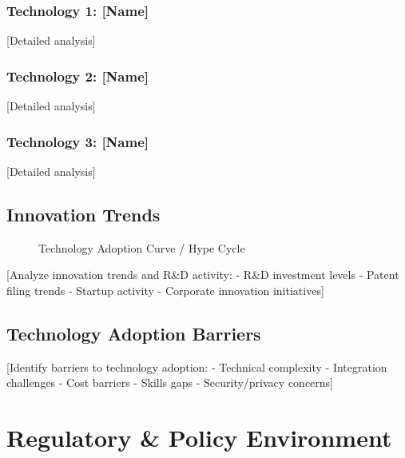 \documentclass[11pt,letterpaper]{report}
\begin{document}
\subsection{Technology 1: [Name]}
[Detailed analysis]

\subsection{Technology 2: [Name]}
[Detailed analysis]

\subsection{Technology 3: [Name]}
[Detailed analysis]

\section{Innovation Trends}


\begin{figure}[htbp]
\centering
\caption{Technology Adoption Curve / Hype Cycle}
\label{fig:innovation}
\end{figure}

[Analyze innovation trends and R\&D activity:
- R\&D investment levels
- Patent filing trends
- Startup activity
- Corporate innovation initiatives]

\section{Technology Adoption Barriers}

[Identify barriers to technology adoption:
- Technical complexity
- Integration challenges
- Cost barriers
- Skills gaps
- Security/privacy concerns]

\chapter{Regulatory \& Policy Environment}
\end{document}
